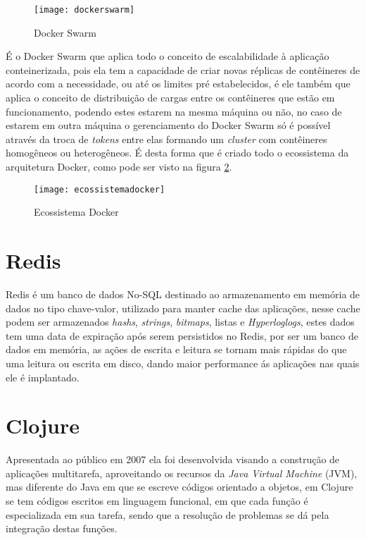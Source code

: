 \begin{figure}[!h]
\caption{\label{fig:dockerswarm} Docker Swarm}
\begin{center}
\texttt{[image: dockerswarm]}
\end{center}
\end{figure}


É o Docker Swarm que aplica todo o conceito de escalabilidade à aplicação conteinerizada, pois ela tem a capacidade de criar novas réplicas de contêineres de acordo com a necessidade, ou até os limites pré estabelecidos, é ele também que aplica o conceito de distribuição de cargas entre os contêineres que estão em funcionamento, podendo estes estarem na mesma máquina ou não, no caso de estarem em outra máquina o gerenciamento do Docker Swarm só é possível através da troca de \textit{tokens} entre elas formando um \textit{cluster} com contêineres homogêneos ou heterogêneos. É desta forma que é criado todo o ecossistema da arquitetura Docker, como pode ser visto na figura \ref{fig:ecossistemadocker}.~\cite{dockerswarm}  

\begin{figure}[!h]
\caption{\label{fig:ecossistemadocker} Ecossistema Docker}
\begin{center}
\texttt{[image: ecossistemadocker]}
\end{center}
\end{figure}

\section{Redis}
\label{sec:redis}
Redis é um banco de dados No-SQL destinado ao armazenamento em memória de dados no tipo chave-valor, utilizado para manter cache das aplicações, nesse cache podem ser armazenados \textit{hashs}, \textit{strings}, \textit{bitmaps}, listas e \textit{Hyperloglogs}, estes dados tem uma data de expiração após serem persistidos no Redis, por ser um banco de dados em memória, as ações de escrita e leitura se tornam mais rápidas do que uma leitura ou escrita em disco, dando maior performance ás aplicações nas quais ele é implantado.~\cite{da2015redis}

\section{Clojure}
Apresentada ao público em 2007 ela foi desenvolvida visando a construção de aplicações multitarefa, aproveitando os recursos da \textit{Java Virtual Machine} (JVM), mas diferente do Java em que se escreve códigos orientado a objetos, em Clojure se tem códigos escritos em linguagem funcional, em que cada função é especializada em sua tarefa, sendo que a resolução de problemas se dá pela integração destas funções.

